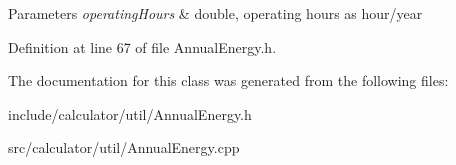\begin{DoxyParams}{Parameters}
{\em operating\+Hours} & double, operating hours as hour/year \\
\hline
\end{DoxyParams}


Definition at line 67 of file Annual\+Energy.\+h.



The documentation for this class was generated from the following files\+:\begin{DoxyCompactItemize}
\item 
include/calculator/util/Annual\+Energy.\+h\item 
src/calculator/util/Annual\+Energy.\+cpp\end{DoxyCompactItemize}
